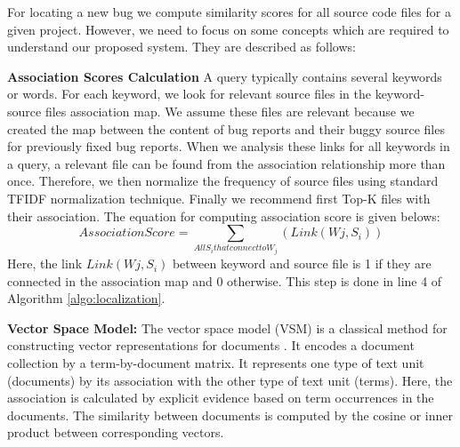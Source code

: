 \documentclass[conference]{IEEEtran}
\begin{document}
For locating a new bug we compute similarity scores for all source code files for a given project. However, we need to focus on some concepts which are required to understand our proposed system. They are described as follows:

\textbf{Association Scores Calculation}
A query typically contains several keywords or words. For each keyword, we look for relevant source files in the keyword-source files association map. We assume these files are relevant because we created the map between the content of bug reports and their buggy source files for previously fixed bug reports. When we analysis these links for all keywords in a query, a relevant file can be found from the association relationship more than once. Therefore, we then normalize the frequency of source files using standard TFIDF normalization technique. Finally we recommend first Top-K files with their association. The equation for computing association score is given belows:
\begin{equation}\label{CoOccequation}
AssociationScore=\sum_{All S_{i} that connect to W_{j}}(Link(W{j},S_{i}))
\end{equation}
Here, the link $Link(W{j},S_{i})$ between keyword and source file is 1 if they are connected in the association map and 0 otherwise. This step is done in line 4 of Algorithm \ref{algo:localization}.

\textbf{Vector Space Model:}
The vector space model (VSM) is a classical method for constructing vector representations for documents \cite{Salton}. 
It encodes a document collection by a term-by-document matrix. It represents one type of text unit (documents) by its association with the other type of text unit (terms). Here, the association is calculated by explicit evidence based on term occurrences in the documents.
The similarity between documents is computed by the cosine or inner product between corresponding vectors.
\end{document}
